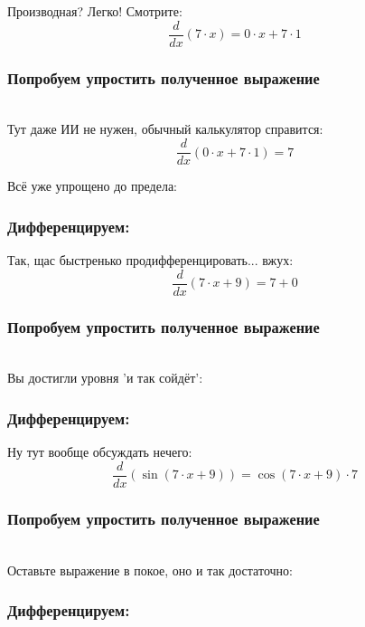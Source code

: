 \documentclass[a4paper,12pt]{article}
\begin{document}
Производная? Легко! Смотрите:
\begin{dmath}\frac{d}{dx}\left(7\cdot x\right)=0\cdot x+ 7\cdot 1\end{dmath}
\subsubsection*{Попробуем упростить полученное выражение}
\\Тут даже ИИ не нужен, обычный калькулятор справится:\\
\begin{dmath}
	\frac{d}{dx}\left(0\cdot x+ 7\cdot 1\right) = 7\end{dmath}

Всё уже упрощено до предела:

\subsubsection*{Дифференцируем:}

Так, щас быстренько продифференцировать... вжух:
\begin{dmath}\frac{d}{dx}\left(7\cdot x+ 9\right)=7+ 0\end{dmath}
\subsubsection*{Попробуем упростить полученное выражение}
\\Вы достигли уровня 'и так сойдёт':

\subsubsection*{Дифференцируем:}

Ну тут вообще обсуждать нечего:
\begin{dmath}\frac{d}{dx}\left(\operatorname{sin}\left(7\cdot x+ 9\right) \right)=\operatorname{cos}\left(7\cdot x+ 9\right) \cdot 7\end{dmath}
\subsubsection*{Попробуем упростить полученное выражение}
\\Оставьте выражение в покое, оно и так достаточно:

\subsubsection*{Дифференцируем:}
\end{document}
